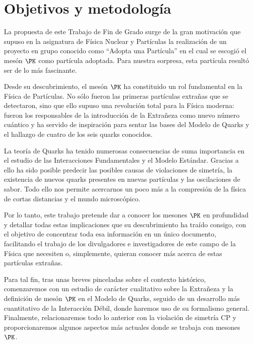 \chapter*{Objetivos y metodología}
\label{cap:objetivos}

La propuesta de este Trabajo de Fin de Grado surge de la gran motivación que supuso en la asignatura de Física Nuclear y Partículas la realización de un proyecto en grupo conocido como ``Adopta una Partícula'' en el cual se escogió el mesón $\PK$ como partícula adoptada. Para nuestra sorpresa, esta partícula resultó ser de lo más fascinante.

Desde su descubrimiento, el mesón $\PK$ ha constituido un rol fundamental en la Física de Partículas. No sólo fueron las primeras partículas extrañas que se detectaron, sino que ello supuso una revolución total para la Física moderna: fueron los responsables de la introducción de la Extrañeza como nuevo número cuántico y ha servido de inspiración para sentar las bases del Modelo de Quarks y el hallazgo de cuatro de los seis quarks conocidos.

La teoría de Quarks ha tenido numerosas consecuencias de suma importancia en el estudio de las Interacciones Fundamentales y el Modelo Estándar. Gracias a ello ha sido posible predecir las posibles causas de violaciones de simetría, la existencia de nuevos quarks presentes en nuevas partículas y las oscilaciones de sabor. Todo ello nos permite acercarnos un poco más a la compresión de la física de cortas distancias y el mundo microscópico. 

Por lo tanto, este trabajo pretende dar a conocer los mesones $\PK$ en profundidad y detallar todas estas implicaciones que su descubrimiento ha traído consigo, con el objetivo de concentrar toda esa información en un único documento, facilitando el trabajo de los divulgadores e investigadores de este campo de la Física que necesiten o, simplemente, quieran conocer más acerca de estas partículas extrañas. %

Para tal fin, tras unas breves pinceladas sobre el contexto histórico, comenzaremos con un estudio de carácter cualitativo sobre la Extrañeza y la definición de mesón $\PK$ en el Modelo de Quarks, seguido de un desarrollo más cuantitativo de la Interacción Débil, donde haremos uso de su formalismo general. Finalmente, relacionaremos todo lo anterior con la violación de simetría CP y proporcionaremos algunos aspectos más actuales donde se trabaja con mesones $\PK$.



